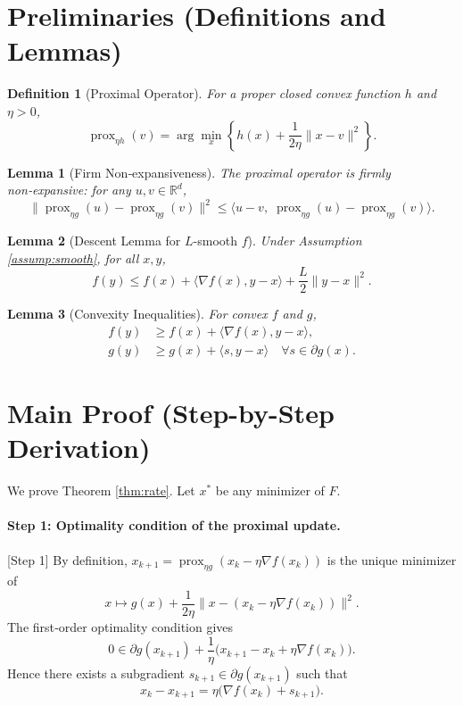 \documentclass{article}
\newtheorem{lemma}{Lemma}
\newtheorem{definition}{Definition}
\begin{document}
\section*{Preliminaries (Definitions and Lemmas)}

\begin{definition}[Proximal Operator]
For a proper closed convex function $h$ and $\eta > 0$,
\[
\operatorname{prox}_{\eta h}(v) = \arg\min_{x} \left\{ h(x) + \frac{1}{2\eta}\|x-v\|^2 \right\}.
\]
\end{definition}

\begin{lemma}[Firm Non‑expansiveness]\label{lem:firm}
The proximal operator is firmly non‑expansive: for any $u,v \in \mathbb{R}^d$,
\[
\|\operatorname{prox}_{\eta g}(u) - \operatorname{prox}_{\eta g}(v)\|^2 \le \langle u-v,\; \operatorname{prox}_{\eta g}(u) - \operatorname{prox}_{\eta g}(v) \rangle.
\]
\end{lemma}

\begin{lemma}[Descent Lemma for $L$-smooth $f$]\label{lem:descent}
Under Assumption \ref{assump:smooth}, for all $x,y$,
\[
f(y) \le f(x) + \langle \nabla f(x), y-x \rangle + \frac{L}{2}\|y-x\|^2.
\]
\end{lemma}

\begin{lemma}[Convexity Inequalities]\label{lem:convex}
For convex $f$ and $g$,
\begin{align}
f(y) &\ge f(x) + \langle \nabla f(x), y-x \rangle, \label{eq:cvx_f} \\
g(y) &\ge g(x) + \langle s, y-x \rangle \quad \forall s \in \partial g(x). \label{eq:cvx_g}
\end{align}
\end{lemma}

\section*{Main Proof (Step-by-Step Derivation)}

We prove Theorem \ref{thm:rate}. Let $x^*$ be any minimizer of $F$.

\paragraph{Step 1: Optimality condition of the proximal update.} [Step 1]
By definition, $x_{k+1} = \operatorname{prox}_{\eta g}(x_k - \eta \nabla f(x_k))$ is the unique minimizer of
\[
x \mapsto g(x) + \frac{1}{2\eta}\|x - (x_k - \eta \nabla f(x_k))\|^2.
\]
The first‑order optimality condition gives
\[
0 \in \partial g(x_{k+1}) + \frac{1}{\eta}\bigl(x_{k+1} - x_k + \eta \nabla f(x_k)\bigr).
\]
Hence there exists a subgradient $s_{k+1} \in \partial g(x_{k+1})$ such that
\[
x_k - x_{k+1} = \eta \bigl( \nabla f(x_k) + s_{k+1} \bigr). \tag{1}
\]
\end{document}
